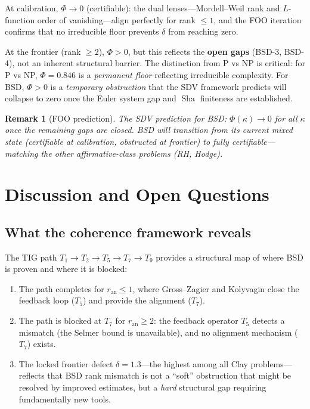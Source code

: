 \documentclass[11pt]{article}
\newtheorem{remark}[theorem]{Remark}
\DeclareMathOperator{\Sha}{Sha}
\begin{document}
\noindent
At calibration, $\Phi \to 0$ (certifiable): the dual lenses---Mordell--Weil
rank and $L$-function order of vanishing---align perfectly for rank $\leq 1$,
and the FOO iteration confirms that no irreducible floor prevents $\delta$
from reaching zero.

At the frontier (rank $\geq 2$), $\Phi > 0$, but this reflects the
\textbf{open gaps} (BSD-3, BSD-4), not an inherent structural barrier.  The
distinction from P vs NP is critical: for P vs NP, $\Phi = 0.846$ is a
\emph{permanent floor} reflecting irreducible complexity.  For BSD,
$\Phi > 0$ is a \emph{temporary obstruction} that the SDV framework predicts
will collapse to zero once the Euler system gap and $\Sha$ finiteness are
established.

\begin{remark}[FOO prediction]
The SDV prediction for BSD: $\Phi(\kappa) \to 0$ for all $\kappa$ once the
remaining gaps are closed.  BSD will transition from its current
mixed state (certifiable at calibration, obstructed at frontier) to
fully certifiable---matching the other affirmative-class problems (RH, Hodge).
\end{remark}

\section{Discussion and Open Questions}
\label{sec:discussion}

\subsection{What the coherence framework reveals}

The TIG path $T_1 \to T_2 \to T_5 \to T_7 \to T_9$ provides a structural map
of where BSD is proven and where it is blocked:

\begin{enumerate}
  \item The path completes for $r_{\mathrm{an}} \leq 1$, where Gross--Zagier and
    Kolyvagin close the feedback loop ($T_5$) and provide the alignment ($T_7$).
  \item The path is blocked at $T_7$ for $r_{\mathrm{an}} \geq 2$: the feedback
    operator $T_5$ detects a mismatch (the Selmer bound is unavailable), and no
    alignment mechanism ($T_7$) exists.
  \item The locked frontier defect $\delta = 1.3$---the highest among all Clay
    problems---reflects that BSD rank mismatch is not a ``soft'' obstruction that
    might be resolved by improved estimates, but a \emph{hard} structural gap
    requiring fundamentally new tools.
\end{enumerate}
\end{document}
